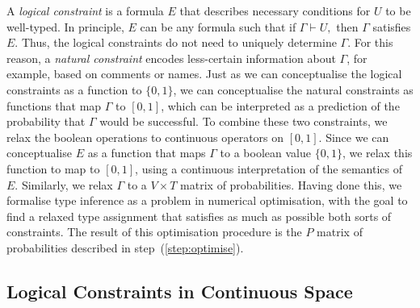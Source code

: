 \documentclass[acmsmall, review, anonymous]{acmart}\settopmatter{printfolios=true,printccs=false,printacmref=false}
\begin{document}
A \emph{logical constraint} is a formula $E$ that describes
necessary conditions for $U$ to be well-typed.
In principle, $E$ can be any formula such that if $\Gamma \vdash U,$
then $\Gamma$ satisfies $E$.
Thus, the logical constraints
do not need to uniquely determine $\Gamma$.
For this reason, a \emph{natural constraint}
encodes less-certain information about $\Gamma$,
for example, based on comments or names.
Just as we can conceptualise the logical
constraints as a function to $\{0, 1\}$,
we can conceptualise the natural constraints as functions
that map $\Gamma$ to $[0, 1]$, which can be interpreted
as a prediction of the probability that $\Gamma$ would
be successful. To combine these two constraints, we relax the boolean operations to continuous operators on $[0, 1]$.
Since we can conceptualise $E$ as a function
that maps $\Gamma$ to a boolean value $\{0, 1\}$,
we relax this function to map to $[0,1]$, using
a continuous interpretation of the semantics of $E$.
Similarly, we relax $\Gamma$ to a $V \times T$ matrix of probabilities.
Having done this,
we formalise type inference as a problem in
numerical optimisation, with the goal to find a relaxed type assignment
that satisfies as much as possible both sorts of constraints.
The result of this optimisation procedure is the
$P$ matrix of probabilities described in step~(\ref{step:optimise}).

\subsection{Logical Constraints in Continuous Space}\label{ssec:logcon}

%
\end{document}
